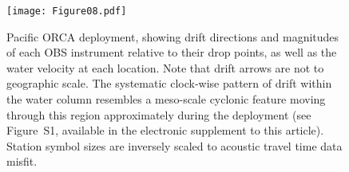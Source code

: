 \newpage

\begin{figure}[h]
\texttt{[image: Figure08.pdf]}
\caption{Pacific ORCA deployment, showing drift directions and magnitudes of each OBS instrument relative to their drop points, as well as the water velocity at each location. Note that drift arrows are not to geographic scale. The systematic clock-wise pattern of drift within the water column resembles a meso-scale cyclonic feature moving through this region approximately during the deployment (see Figure~S1, available in the electronic supplement to this article). Station symbol sizes are inversely scaled to acoustic travel time data misfit.}
\label{fig:meso_eddy}
\end{figure}